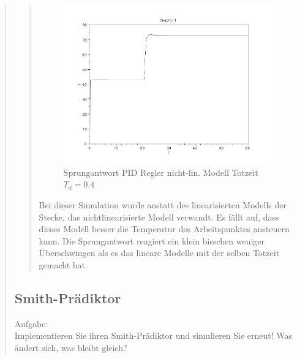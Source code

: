 \begin{quote}
    \begin{quote}
        \begin{figure}[H]
        \centering
            \includegraphics[scale=0.7, trim = 0cm 0cm 0cm 0cm, clip]{./Bilder/4_2_Td_04}
                \caption{Sprungantwort PID Regler nicht-lin. Modell Totzeit $T_d = 0.4$}
        \end{figure}
    
        Bei dieser Simulation wurde anstatt des linearisierten Modells der Stecke, das nichtlinearisierte Modell
        verwandt. Es fällt auf, dass dieses Modell besser die Temperatur des Arbeitspunktes ansteuern kann. Die
        Sprungantwort reagiert ein klein bisschen weniger Überschwingen als es das lineare Modelle mit der selben
        Totzeit gemacht hat.
    
    \end{quote}
    
    \subsection{Smith-Prädiktor}
    Aufgabe:\\
    Implementieren Sie ihren Smith-Prädiktor und simulieren Sie erneut! Was ändert sich, was bleibt gleich?\vspace{1em}
    

\end{quote}
